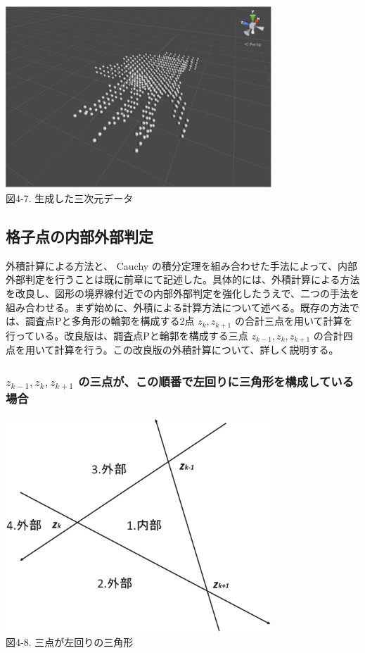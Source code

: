 \begin{center}
  \includegraphics[width=10cm]{Simulator_data_3d.eps} \\
 \vspace{1mm}
  図4-7. 生成した三次元データ
\end{center}



\newpage
\subsection{格子点の内部外部判定}
外積計算による方法と、 Cauchy の積分定理を組み合わせた手法によって、内部外部判定を行うことは既に前章にて記述した。具体的には、外積計算による方法を改良し、図形の境界線付近での内部外部判定を強化したうえで、二つの手法を組み合わせる。まず始めに、外積による計算方法について述べる。既存の方法では、調査点Pと多角形の輪郭を構成する2点 $z_k,z_{k+1}$ の合計三点を用いて計算を行っている。改良版は、調査点Pと輪郭を構成する三点 $z_{k-1},z_k,z_{k+1}$ の合計四点を用いて計算を行う。この改良版の外積計算について、詳しく説明する。

\subsubsection{$z_{k-1},z_k,z_{k+1}$ の三点が、この順番で左回りに三角形を構成している場合}

\begin{center}
  \includegraphics[width=10cm]{hidarimawari_vec.eps} \\
 \vspace{-1mm}
  図4-8. 三点が左回りの三角形
\end{center}


